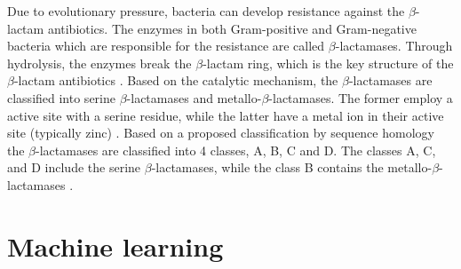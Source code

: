 Due to evolutionary pressure, bacteria can develop resistance against the $\beta$-lactam antibiotics. The enzymes in both Gram-positive and Gram-negative bacteria which are responsible for the resistance are called $\beta$-lactamases. Through hydrolysis, the enzymes break the $\beta$-lactam ring, which is the key structure of the $\beta$-lactam antibiotics \cite{ambler1980}.
Based on the catalytic mechanism, the $\beta$-lactamases are classified into serine $\beta$-lactamases and metallo-$\beta$-lactamases. The former employ a active site with a serine residue, while the latter have a metal ion in their active site (typically zinc) \cite{kim2023} \cite{ambler1980}. Based on a proposed classification by sequence homology \cite{bush2013} the $\beta$-lactamases are classified into 4 classes, A, B, C and D. The classes A, C, and D include the serine $\beta$-lactamases, while the class B contains the metallo-$\beta$-lactamases \cite{bush2013}.


\section{Machine learning}

